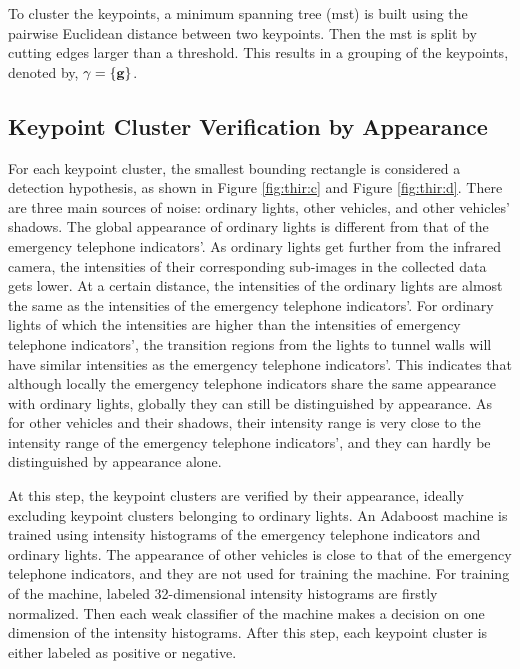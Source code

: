 \documentclass{JoITSRstyle}
\begin{document}
To cluster the keypoints, a minimum spanning tree (mst) is built using the pairwise Euclidean distance between two keypoints. Then the mst is split by cutting edges larger than a threshold. This results in a grouping  of the keypoints, denoted by, $\gamma=\{\bf{g}\}$.


\subsection{Keypoint Cluster Verification by Appearance}

For each keypoint cluster, the smallest bounding rectangle is considered a detection hypothesis, as shown in Figure \ref{fig:thir:c} and Figure \ref{fig:thir:d}. There are three main sources of noise: ordinary lights, other vehicles, and other vehicles' shadows. The global appearance of ordinary lights is different from that of the emergency telephone indicators'. As ordinary lights get further from the infrared camera, the intensities of their corresponding sub-images in the collected data gets lower. At a certain distance, the intensities of the ordinary lights are almost the same as the intensities of the emergency telephone indicators'. For ordinary lights of which the intensities are higher than the intensities of emergency telephone indicators', the transition regions from the lights to tunnel walls will have similar intensities as the emergency telephone indicators'.
This indicates that although locally the emergency telephone indicators share the same appearance with ordinary lights, globally they can still be distinguished by appearance. As for other vehicles and their shadows, their intensity range is very close to the intensity range of the emergency telephone indicators', and they can hardly be distinguished by appearance alone.



At this step, the keypoint clusters are verified by their appearance, ideally excluding keypoint clusters belonging to ordinary lights. An Adaboost machine is trained using intensity histograms of the emergency telephone indicators and ordinary lights. The appearance of other vehicles is close to that of the emergency telephone indicators, and they are not used for training the machine. For training of the machine, labeled 32-dimensional intensity histograms are firstly normalized. Then each weak classifier of the machine makes a decision on one dimension of the intensity histograms. After this step, each keypoint cluster is either labeled as positive or negative.
\end{document}

